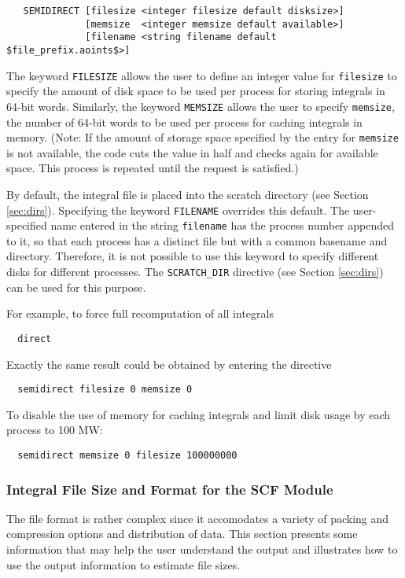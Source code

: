 \begin{verbatim}
   SEMIDIRECT [filesize <integer filesize default disksize>] 
              [memsize  <integer memsize default available>]
              [filename <string filename default $file_prefix.aoints$>]
\end{verbatim}

The keyword \verb+FILESIZE+ allows the user to define an integer value
for \verb+filesize+ to specify the amount of disk space to be used per
process for storing integrals in 64-bit words.  Similarly, the keyword
\verb+MEMSIZE+ allows the user to specify \verb+memsize+, the number
of 64-bit words to be used per process for caching integrals in
memory. (Note: If the amount of storage space specified by the entry
for \verb+memsize+ is not available, the code cuts the value in half
and checks again for available space.  This process is repeated until
the request is satisfied.)  

By default, the integral file is placed into the scratch directory
(see Section \ref{sec:dirs}). Specifying the keyword \verb+FILENAME+
overrides this default.  The user-specified name entered in the string
\verb+filename+ has the process number appended to it, so that each
process has a distinct file but with a common basename and directory.
Therefore, it is not possible to use this keyword to specify different
disks for different processes.  The \verb+SCRATCH_DIR+ directive (see
Section \ref{sec:dirs}) can be used for this purpose.

For example, to force full recomputation of all integrals
\begin{verbatim}
  direct
\end{verbatim}

Exactly the same result could be obtained by entering the directive
\begin{verbatim}
  semidirect filesize 0 memsize 0
\end{verbatim}

To disable the use of memory for caching integrals and limit disk
usage by each process to 100 MW:
\begin{verbatim}
  semidirect memsize 0 filesize 100000000
\end{verbatim}


\subsubsection{Integral File Size and Format for the SCF Module}

The file format is rather complex since it accomodates a variety of
packing and compression options and distribution of data.  This
section presents some information that may help the user understand
the output and illustrates how to use the output information to
estimate file sizes.

